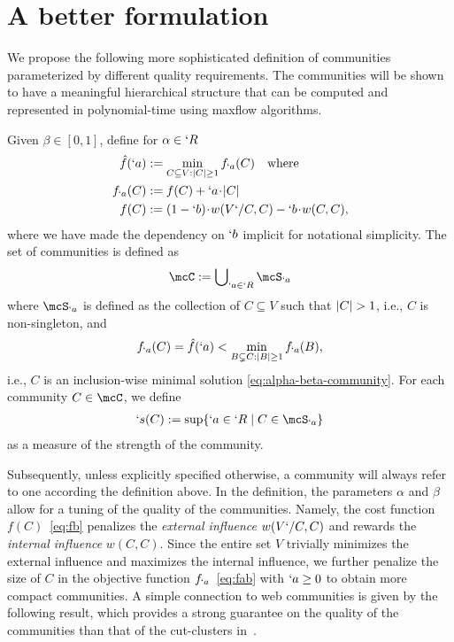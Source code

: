 \section{A better formulation}
\label{sec:problem}
 
We propose the following more sophisticated definition of communities parameterized by different quality requirements. The communities will be shown to have a meaningful hierarchical structure that can be computed and represented in polynomial-time using maxflow algorithms.

\begin{definition}
  \label{def:alpha-beta}
  Given $\beta\in [0,1]$, define for $\alpha\in `R$
        \begin{subequations}
          \label{eq:alpha-beta-community}
          \begin{align}
            \hat{f}(`a)&:=\min_{C\subseteq V:\lvert C\rvert\geq 1} f_{`a}(C) \quad \text{where}\label{eq:fhat}\\
            f_{`a}(C)&:=f(C) + `a \!\cdot\! |C| \label{eq:fab}\\
            f(C)&:=(1-`b)\!\cdot\! w(V`/ C, C) - `b \!\cdot\! w(C,C),\label{eq:fb}
          \end{align}
        \end{subequations}
        where we have made the dependency on $`b$ implicit for notational simplicity. The set of communities is defined as
        \begin{align}
          \mcC := \bigcup\nolimits_{`a\in `R} \mcS_{`a}\label{eq:mcC}
        \end{align}
        where $\mcS_{`a}$ is defined as the collection of $C\subseteq V$ such that $\lvert C\rvert>1$, i.e., $C$ is non-singleton, and
        \begin{align}
          f_{`a}(C)=\hat{f}(`a)< \min_{B\subsetneq C:\lvert B\rvert\geq 1} f_{`a}(B),\label{eq:mcS}
        \end{align}
        i.e., $C$ is an inclusion-wise minimal solution \eqref{eq:alpha-beta-community}. For each community $C\in \mcC$, we define
        \begin{align}
          `s(C) := \sup\Set*{`a\in `R \mid C\in \mcS_{`a}}\label{eq:`s}
        \end{align}
        as a measure of the strength of the community.
\end{definition}

Subsequently, unless explicitly specified otherwise, a community will always refer to one according
the definition above. 
In the definition,
the parameters $\alpha$ and $\beta$ allow for a tuning of the quality of the communities.
Namely, the cost function $f(C)$~\eqref{eq:fb} penalizes the \emph{external influence}
$w(V`/ C, C)$ and rewards the \emph{internal influence} $w(C,C)$. Since the entire set $V$
trivially minimizes the external influence and maximizes the internal influence, we further penalize the
size of $C$ in the objective function $f_{`a}$~\eqref{eq:fab} with $`a\geq 0$ to obtain more compact
communities. A simple connection to web communities is given by the following result, which provides a strong guarantee on the quality of the communities than that of the cut-clusters in~\cite[Lemma~3.1]{flake:cut-clustering}.


